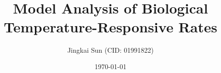 \documentclass[11pt]{article}
\title{Model Analysis of Biological Temperature-Responsive Rates}
\author{Jingkai Sun (CID: 01991822)}
\date{\today}
\begin{document}


\maketitle
\linenumbers









\end{document}
